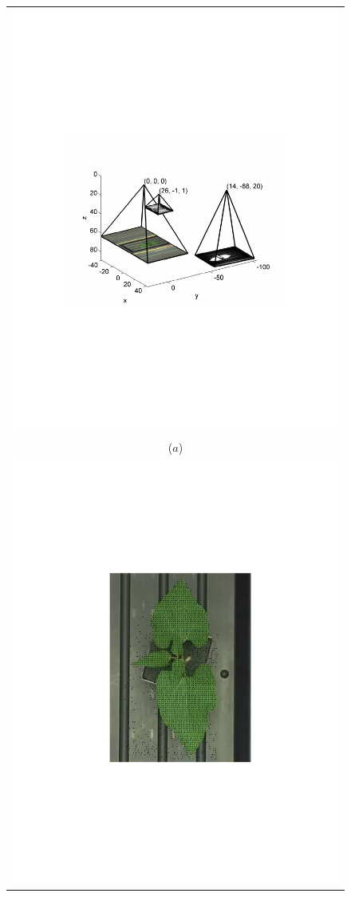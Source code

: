 \begin{figure}
\begin{tabular}{c}
  \includegraphics[width=\linewidth,trim=120 240 80 300,clip]{Figures/CameraConfiguration} \\
  ($a$)\\
  \includegraphics[width=0.65\linewidth,trim=175 220 162 180, clip,angle=-90,origin=c]{Figures/DepthOnBeanRGB} \vspace{-10mm} \\

\end{tabular}
\end{figure}
